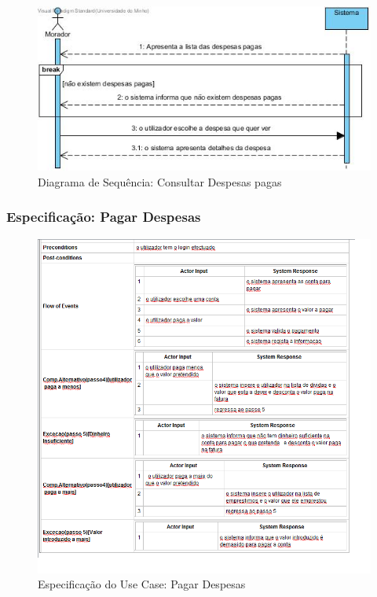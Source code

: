 \begin{figure}[htb!]
	\centering
	\includegraphics[scale=0.6]{imagens/DiagramaSeq/ConsultarDespesasPagas}  
	\caption{Diagrama de Sequência: Consultar Despesas pagas }  
\end{figure}



\subsubsection{Especificação: Pagar Despesas }

\begin{figure}[htb!]
	\centering
	\includegraphics[scale=0.6]{imagens/Especificacoes/pagardespesas}  
	\caption{Especificação do Use Case: Pagar Despesas}  
\end{figure}


